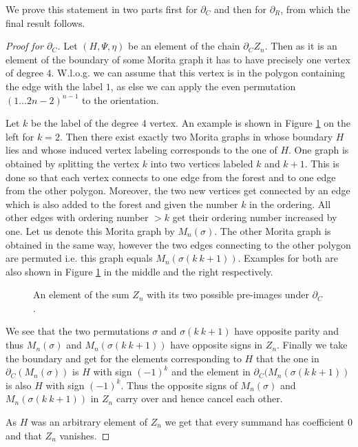 We prove this statement in two parts first for $\partial_{C}$ and then for $\partial_{R}$, from which the final result follows.
\begin{proof}[Proof for $\partial_C$]
	Let $(H,\Psi,\eta)$ be an element of the chain $\partial_{C} Z_{n}$.
	Then as it is an element of the boundary of some Morita graph it has to
	have precisely one vertex of degree $4$. W.l.o.g. we can assume that this vertex is in the polygon containing the 
	edge with the label $1$, as else we can apply the even permutation $(1 \ldots 2n-2)^{n-1}$ to the orientation.

	Let $k$ be the label of the degree $4$ vertex. An example is shown in Figure \ref{fig:MoritaCycleDC} on the left for $k = 2$. 
	Then there exist exactly two Morita graphs in whose boundary $H$ lies and whose induced vertex labeling corresponds to the one of $H$.
	One graph is obtained by splitting the vertex $k$ into two vertices labeled $k$ and $k+1$.
	This is done so that each vertex connects to one edge from the forest and to one edge from the other polygon.
	Moreover, the two new vertices get connected by an edge which is also added to the forest and given the number $k$ in the ordering.
	All other edges with ordering number  $> k $ get their ordering number increased by one. Let us denote this Morita graph by $M_{n}(\sigma)$.
	The other Morita graph is obtained in the same way, however the two edges connecting to the other polygon are permuted i.e.
	this graph equals $M_{n}(\sigma(k\ k+1))$.
	Examples for both are also shown in Figure \ref{fig:MoritaCycleDC} in the middle and the right respectively.

	\begin{figure}[hp]
		\centering
		\caption{An element of the sum $Z_{n}$ with its two possible pre-images under $\partial_{C}$.}
		\label{fig:MoritaCycleDC}
	\end{figure}
	We see that the two permutations $\sigma$ and $\sigma (k\ k+1)$ have opposite parity and thus $M_{n}(\sigma)$ and $M_{n}(\sigma (k\ k+1))$ have
	opposite signs in $Z_{n}$. Finally we take the boundary and get for the elements corresponding to $H$ that
	the one in $\partial_{C}(M_{n}(\sigma))$ is $H$ with sign $(-1)^{k}$ and the element in $\partial_{C}(M_{n}(\sigma (k\ k+1))$ is also $H$ with sign $(-1)^{k}$.
	Thus the opposite signs of $M_{n}(\sigma)$ and $M_{n}(\sigma (k\ k+1))$ in $Z_{n}$ carry over and hence cancel each other.

	As $H$ was an arbitrary element of $Z_{n}$ we get that every summand has coefficient $0$ and that $Z_{n}$ vanishes.
\end{proof}

